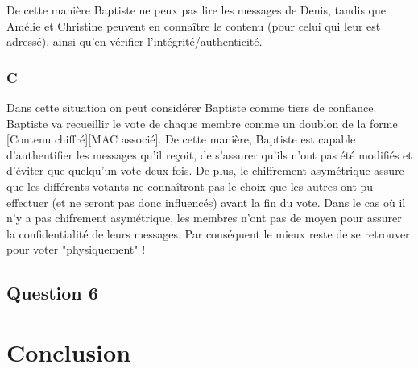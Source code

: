 \documentclass[a4paper, 11pt, oneside]{article}
\begin{document}
De cette manière Baptiste ne peux pas lire les messages de Denis, tandis que Amélie et Christine peuvent en connaître le contenu (pour celui qui leur est adressé), ainsi qu'en vérifier l'intégrité/authenticité.

\subsubsection{C}

Dans cette situation on peut considérer Baptiste comme tiers de confiance. Baptiste va recueillir le vote de chaque membre comme un doublon de la forme [Contenu chiffré][MAC associé]. De cette manière, Baptiste est capable d'authentifier les messages qu'il reçoit, de s'assurer qu'ils n'ont pas été modifiés et d'éviter que quelqu'un vote deux fois. De plus, le chiffrement asymétrique assure que les différents votants ne connaîtront pas le choix que les autres ont pu effectuer (et ne seront pas donc influencés) avant la fin du vote.
Dans le cas où il n'y a pas chifrement asymétrique, les membres n'ont pas de moyen pour assurer la confidentialité de leurs messages. Par conséquent le mieux reste de se retrouver pour voter "physiquement" !

\subsection{Question 6}

\section*{Conclusion}
\end{document}
